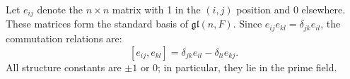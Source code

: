Let $e_{ij}$ denote the $n \times n$ matrix with 1 in the $(i, j)$ position and 0 elsewhere. These matrices form the standard basis of $\mathfrak{gl}(n, F)$. Since $e_{ij}e_{kl} = \delta_{jk}e_{il}$, the commutation relations are:
$$[e_{ij}, e_{kl}] = \delta_{jk}e_{il} - \delta_{li}e_{kj}.$$
All structure constants are $\pm 1$ or $0$; in particular, they lie in the prime field.
